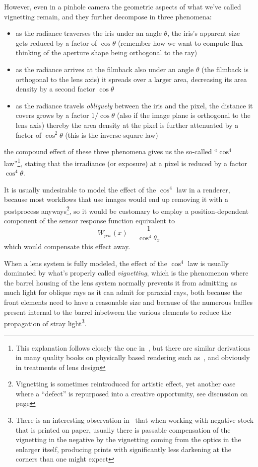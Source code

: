 
However, even in a pinhole camera the geometric aspects of what we've called vignetting remain, 
and they further decompose in three phenomena:
\begin{itemize}
	\item as the radiance traverses the iris under an angle $\theta$,
	      the iris's apparent size gets reduced by a factor of $\cos\theta$ (remember how we
	      want to compute flux thinking of the aperture shape being orthogonal
	      to the ray)
	\item as the radiance arrives at the filmback also under an angle $\theta$
		  (the filmback is orthogonal to the lens axis) it spreads over
		  a larger area, decreasing its area density by a second factor $\cos\theta$
	\item as the radiance travels \emph{obliquely} between the iris and the pixel,
		  the distance it covers grows by a factor $1/\cos\theta$ (also if the image plane is
		  orthogonal to the lens axis) thereby the area density
		  at the pixel is further attenuated by a factor of $\cos^2\theta$ (this is
		  the inverse-square law)
\end{itemize}
the compound effect of these three phenomena gives us the so-called ``$\cos^4$ law''\footnote{
	This explanation follows closely the one in~\cite[Ch. 6]{kingslake92}, but there are 
	similar derivations in many quality books on physically based rendering such 
	as~\cite[Ch. 5.4]{pharr2023}, and obviously in treatments of lens design}, 
stating that the irradiance (or exposure) at a pixel is reduced by a factor $\cos^4\theta$.

It is usually undesirable to model the effect of the $\cos^4$ law in a \gls{renderer},
because most workflows that use images would end up removing it with a postprocess anyways\footnote{
Vignetting is sometimes reintroduced for artistic effect, yet another case where a ``defect'' is 
repurposed into a creative opportunity, see discussion on page \pageref{defects_as_opportunity}},
so it would be customary to employ a position-dependent component of the sensor 
response function equivalent to
\begin{equation}
	W_{pos}(x) = \frac{1}{\cos^4\theta_{x}}
\end{equation}
which would compensate this effect away.

When a lens system is fully modeled, the effect of the  $\cos^4$ law is usually dominated 
by what's properly called \textsl{\gls{vignetting}}, 
which is the phenomenon where the barrel housing of the lens system 
normally prevents it from admitting as much light for oblique rays as it can admit for 
paraxial rays, both because the front elements need to have a reasonable size and because of the 
numerous baffles present internal to the barrel inbetween the various elements
to reduce the propagation of stray light\footnote{
	There is an interesting observation in~\cite{kingslake92} that when working with negative
	stock that is printed on paper, usually there is passable compensation of the vignetting
	in the negative by the vignetting coming from the optics in the enlarger itself, 
	producing prints with significantly less darkening at the corners than one
	might expect}.

